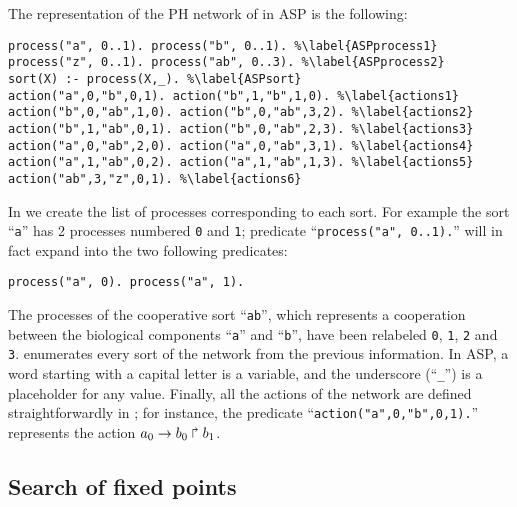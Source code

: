 \begin{example}
\label{ex:asp-ph}
The representation of the PH network of  in ASP is the following:
\begin{lstlisting}
process("a", 0..1). process("b", 0..1). %\label{ASPprocess1}
process("z", 0..1). process("ab", 0..3). %\label{ASPprocess2}
sort(X) :- process(X,_). %\label{ASPsort}
action("a",0,"b",0,1). action("b",1,"b",1,0). %\label{actions1}
action("b",0,"ab",1,0). action("b",0,"ab",3,2). %\label{actions2}
action("b",1,"ab",0,1). action("b",0,"ab",2,3). %\label{actions3}
action("a",0,"ab",2,0). action("a",0,"ab",3,1). %\label{actions4}
action("a",1,"ab",0,2). action("a",1,"ab",1,3). %\label{actions5}
action("ab",3,"z",0,1). %\label{actions6}
\end{lstlisting}
In  we create the list of processes corresponding to each sort.
For example the sort ``\texttt{a}'' has 2 processes numbered \texttt{0} and \texttt{1};
predicate ``\texttt{process("a", 0..1).}'' will in fact expand into the two following predicates:
\begin{lstlisting}[numbers=none]
process("a", 0). process("a", 1).
\end{lstlisting}
The processes of the cooperative sort ``\texttt{ab}'',
which represents a cooperation between the biological components ``\texttt{a}'' and ``\texttt{b}'',
have been relabeled \texttt{0}, \texttt{1}, \texttt{2} and \texttt{3}.
 enumerates every sort of the network from the previous information.
In ASP, a word starting with a capital letter is a variable,
and the underscore (``\texttt{\_}'') is a placeholder for any value.
Finally, all the actions of the network are defined straightforwardly in ;
for instance, the predicate ``\texttt{action("a",0,"b",0,1).}'' represents the action
$a_0\rightarrow b_0\Rsh b_1$.
\end{example}

\subsection{Search of fixed points}

